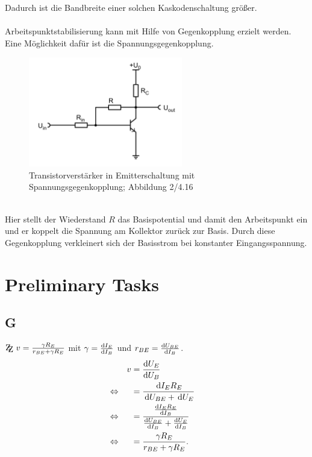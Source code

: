 \documentclass[a4paper,10pt]{article}
\newcommand{\td}{\,\text{d}}
\newcommand{\zz}{\mathrm{Z\kern-.3em\raise-0.5ex\hbox{Z} }}
\numberwithin{equation}{section}
\begin{document}
\begin{multicols}{2}
	Dadurch ist die Bandbreite einer solchen Kaskodenschaltung größer.
	\\\\Arbeitspunktstabilisierung kann mit Hilfe von Gegenkopplung erzielt werden.
	Eine Möglichkeit dafür ist die Spannungsgegenkopplung.
	\begin{figure}[h]
		\centering
		\includegraphics[width=0.6\textwidth]{spannungsgegenkopplung.png}
		\caption{Transistorverstärker in Emitterschaltung mit Spannungsgegenkopplung; Abbildung 2/4.16 \cite{Praktikumsanleitung}}
		\vspace{100cm}
	\end{figure}\\
	Hier stellt der Wiederstand $R$ das Basispotential und damit den Arbeitspunkt ein und er koppelt die Spannung am Kollektor zurück zur Basis.
	Durch diese Gegenkopplung verkleinert sich der Basisstrom bei konstanter Eingangsspannung.

	\newpage
	\section{Preliminary Tasks}
	\subsection{G}
	$\zz\ v=\tfrac{\gamma R_E}{r_{BE}+\gamma R_E}$ mit $\gamma =\diff[]{I_E}{I_B}$ und $r_{BE}=\diff[]{U_{BE}}{I_B}$.
	\begin{align}
		                &  & v & = \diff[]{U_E}{U_B}                                                    &  &           \\
		\Leftrightarrow &  &   & = \dfrac{\td I_ER_E}{\td U_{BE}+\td U_E}                               &  & \nonumber \\
		\Leftrightarrow &  &   & = \dfrac{\diff[]{I_ER_E}{I_B}}{\diff[]{U_{BE}}{I_B}+\diff[]{U_E}{I_B}} &  & \nonumber \\
		\Leftrightarrow &  &   & = \dfrac{\gamma R_E}{r_{BE}+\gamma R_E}.                               &  &
	\end{align}


\end{multicols}
\end{document}
